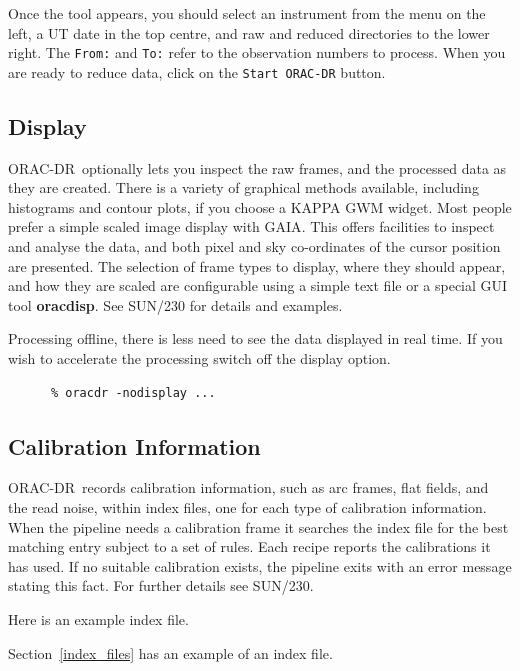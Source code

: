 \documentclass[twoside,11pt]{article}
\newcommand{\htmlref}[2]{#1}
\newenvironment{latexonly}{}{}
\newcommand{\xref}[3]{#1}
\newcommand{\xlabel}[1]{}
\renewcommand{\_}{\texttt{\symbol{95}}}
\newcommand{\GAIA}{{\footnotesize GAIA}}
\newcommand{\KAPPA}{{\footnotesize KAPPA}}
\newcommand{\ORACDR}{{\footnotesize ORAC-DR}}
\begin{document}
Once the tool appears, you should select an instrument from the menu on
the left, a UT date in the top centre, and raw and reduced directories
to the lower right.   The {\tt From:} and {\tt To:} refer to the
observation numbers to process.  When you are ready to reduce data,
click on the {\tt Start ORAC-DR} button.

\subsection{\xlabel{display}Display\label{display}}

\ORACDR\ optionally lets you inspect the raw frames, and the processed
data as they are created.  There is a variety of graphical
methods available, including histograms and contour plots, if you
choose a \xref{\KAPPA}{sun95}{} GWM widget.  Most people prefer a
simple scaled image display with \xref{\GAIA}{sun214}{}.  This offers
facilities to inspect and analyse the data, and both pixel and sky
co-ordinates of the cursor position are presented.  The selection of
frame types to display, where they should appear, and how they are
scaled are configurable using a simple text file or a special GUI tool
{\bf oracdisp}.  See \xref{SUN/230}{sun230}{display_system} for details
and examples.

Processing offline, there is less need to see the data displayed in real time.
If you wish to accelerate the processing switch off the display option.

\begin{verbatim}
      % oracdr -nodisplay ...
\end{verbatim}

\subsection{\xlabel{calibration_information}Calibration Information\label{calibration_information}}

\ORACDR\ records calibration information, such as arc frames, flat
fields, and the read noise, within index files, one for each type of
calibration information.  When the pipeline needs a calibration frame
it searches the index file for the best matching entry subject to a
set of rules. Each recipe reports the calibrations it has used.  If no
suitable calibration exists, the pipeline exits with an error message
stating this fact.  For further details see
\xref{SUN/230}{sun230}{calibration_selection}.
\begin{htmlonly}
Here is an 
\htmlref{example index file.}{index_files}
\end{htmlonly}
\begin{latexonly}
Section~\ref{index_files} has an example of an index file.
\end{latexonly}
\end{document}
